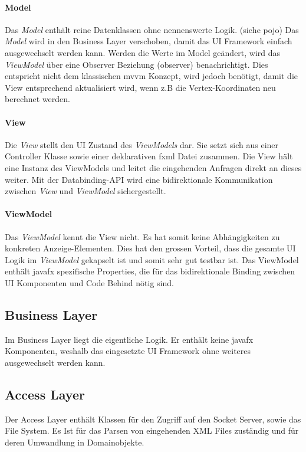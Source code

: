 \documentclass[11pt,a4paper,english,oneside]{book}
\numberwithin{equation}{chapter}
\begin{document}
	\paragraph{Model}
	Das \textit{Model} enthält reine Datenklassen ohne nennenswerte Logik. (siehe \gls{pojo}) Das \textit{Model} wird in den Business Layer verschoben, damit das UI Framework einfach ausgewechselt werden kann. Werden die Werte im Model geändert, wird das \textit{ViewModel} über eine Observer Beziehung (\gls{observer}) benachrichtigt. Dies entspricht nicht dem klassischen \gls{mvvm} Konzept, wird jedoch benötigt, damit die View entsprechend aktualisiert wird, wenn z.B die Vertex-Koordinaten neu berechnet werden.
	
	\paragraph{View}
	Die \textit{View} stellt den UI Zustand des \textit{ViewModels} dar. Sie setzt sich aus einer Controller Klasse sowie einer deklarativen \gls{fxml} Datei zusammen. Die View hält eine Instanz des ViewModels und leitet die eingehenden Anfragen direkt an dieses weiter. Mit der Databinding-API wird eine bidirektionale Kommunikation zwischen \textit{View} und \textit{ViewModel} sichergestellt. 
	
	\paragraph{ViewModel}
	Das \textit{ViewModel} kennt die View nicht. Es hat somit keine Abhängigkeiten zu konkreten Anzeige-Elementen. Dies hat den grossen Vorteil, dass die gesamte UI Logik im \textit{ViewModel} gekapselt ist und somit sehr gut testbar ist. Das ViewModel enthält \gls{javafx} spezifische Properties, die für das bidirektionale Binding zwischen UI Komponenten und Code Behind nötig sind.
	
	\subsection{Business Layer}
	Im Business Layer liegt die eigentliche Logik. Er enthält keine \gls{javafx} Komponenten, weshalb das eingesetzte UI Framework ohne weiteres ausgewechselt werden kann. 
	
	\subsection{Access Layer}
	Der Access Layer enthält Klassen für den Zugriff auf den Socket Server, sowie das File System. Es Ist für das Parsen von eingehenden XML Files zuständig und für deren Umwandlung in Domainobjekte.
\end{document}
